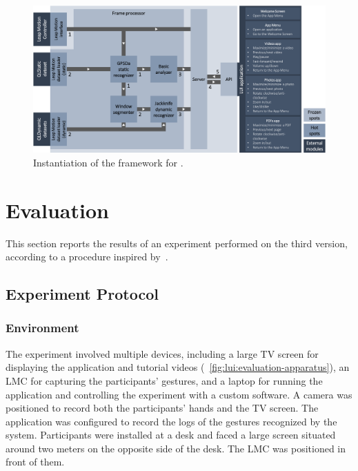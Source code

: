 \begin{figure}[tb]
    \centering
    \includegraphics[width=\linewidth]{Figures/LUI/Architecture/quantumleap-lui.pdf}
    \vspace{-8pt}
    \caption{Instantiation of the \ql framework for \lui.}
    \label{fig:lui:quantumleap}
\end{figure}



\section{Evaluation} \label{sec:lui:evaluation}
This section reports the results of an experiment performed on the third \lui version, according to a procedure inspired by~\cite{Vogiatzidakis:2022}.

\subsection{Experiment Protocol} \label{sec:lui:evaluation:protocol}
\subsubsection{Environment}
The experiment involved multiple devices, including a large TV screen for displaying the \lui application and tutorial videos (\fig~\ref{fig:lui:evaluation-apparatus}), an LMC for capturing the participants' gestures, and a laptop for running the \lui application and controlling the experiment with a custom software. A camera was positioned to record both the participants' hands and the TV screen. The \lui application was configured to record the logs of the gestures recognized by the system.
Participants were installed at a desk and faced a large screen situated around two meters on the opposite side of the desk. The LMC was positioned in front of them.

